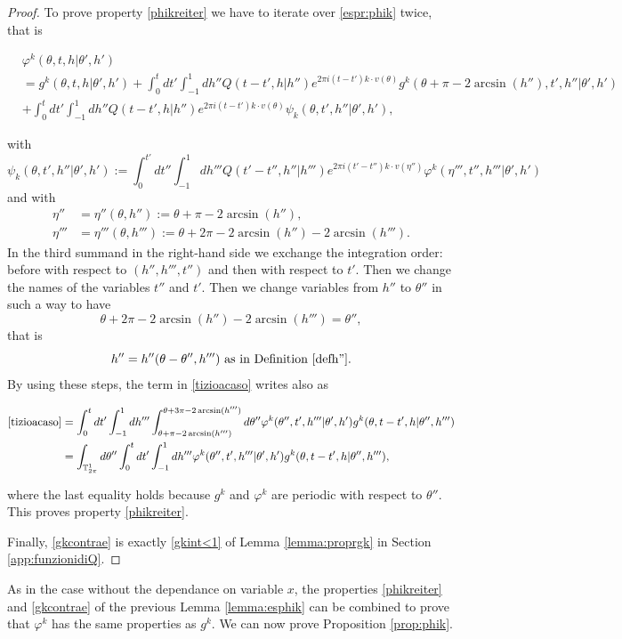 \documentclass[a4paper,10pt,reqno]{amsart}
\numberwithin{equation}{subsection}
\numberwithin{figure}{subsection}
\begin{document}
\begin{proof} To prove property \eqref{phikreiter} we have to iterate over \eqref{espr:phik} twice, that is

{\scriptsize\begin{align}
\nonumber&\varphi^k(\theta,t,h|\theta',h')
\\
\nonumber&=g^k(\theta,t,h|\theta',h')+\int_0^tdt'\int_{-1}^1dh''Q(t-t',h|h'')e^{2\pi i(t-t')k\cdot v(\theta)}g^k(\theta+\pi-2\arcsin(h''),t',h''|\theta',h')
\\
\label{tizioacaso}&+\int_0^tdt'\int_{-1}^1dh''Q(t-t',h|h'')e^{2\pi i(t-t')k\cdot v(\theta)}\psi_k(\theta,t',h''|\theta',h'),
\end{align}}

with
{\small\[
\psi_k(\theta,t',h''|\theta',h'):=\int_0^{t'}dt''\int_{-1}^1dh'''Q(t'-t'',h''|h''') e^{2\pi i(t'-t'')k\cdot v(\eta'')}\varphi^k(\eta''',t'',h'''|\theta',h')
\]}
and with
\begin{align*}
\eta''&=\eta''(\theta,h''):=\theta+\pi-2\arcsin(h''),
\\
\eta'''&=\eta'''(\theta,h'''):=\theta+2\pi-2\arcsin(h'')-2\arcsin(h''').
\end{align*}
In the third summand in the right-hand side we exchange the integration order: before with respect to $(h'',h''',t'')$ and then with respect to $t'$. Then we change the names of the variables $t''$ and $t'$. Then we change variables from $h''$ to $\theta''$ in such a way to have
\[
\theta+2\pi-2\arcsin(h'')-2\arcsin(h''')=\theta'',
\]
that is 
\[
h''=h''(\theta-\theta'',h''')\textrm{ as in Definition \ref{defh''}.}
\]
By using these steps, the term in \eqref{tizioacaso} writes also as

{\small\begin{align*}
\eqref{tizioacaso}&=\int_0^tdt'\int_{-1}^1dh'''\int_{\theta+\pi-2\arcsin(h''')}^{\theta+3\pi-2\arcsin(h''')}d\theta''\varphi^k(\theta'',t',h'''|\theta',h')g^k(\theta,t-t',h|\theta'',h''')
\\
&=\int_{\mathbb{T}^1_{2\pi}}d\theta''\int_0^tdt'\int_{-1}^1dh'''\varphi^k(\theta'',t',h'''|\theta',h')g^k(\theta,t-t',h|\theta'',h'''),
\end{align*}}

where the last equality holds because $g^k$ and $\varphi^k$ are periodic with respect to $\theta''$. This proves property \eqref{phikreiter}.

Finally, \eqref{gkcontrae} is exactly \eqref{gkint<1} of Lemma \ref{lemma:proprgk} in Section \ref{app:funzionidiQ}.
\end{proof}
As in the case without the dependance on variable $x$, the properties \eqref{phikreiter} and \eqref{gkcontrae} of the previous Lemma \ref{lemma:esphik} can be combined to prove that $\varphi^k$ has the same properties as $g^k$. We can now prove Proposition \ref{prop:phik}.
\newline
\end{document}
